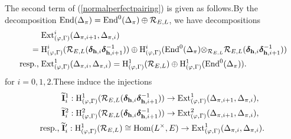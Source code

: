 \documentclass[SecEq,CM,GP]{degruyter-crelle} %
\theoremstyle{plain}
\newcommand{\EndO}{{\rm End}}
\newcommand{\ext}{{\rm Ext}}
\newcommand{\homo}{{\rm Hom}}
\newcommand{\hH}{{\mathrm{H}}}
\newcommand{\tee}{{{\otimes}_{\cR_{E,L}}}}
\newcommand{\bh}{{\mathbf{h}}}
\newcommand{\cR}{\mathcal R}
\begin{document}
The second term of (\ref{normalperfectpairing}) is given as follows.\;By the decomposition $\EndO(\Delta_{\pi})=\EndO^0(\Delta_{\pi})\oplus \cR_{E,L}$, we have decompositions
\begin{equation}\label{Linvariantdecomp}
\begin{aligned}
	&\ext^i_{(\varphi,\Gamma)}(\Delta_{\pi,i+1},\Delta_{\pi,i})\\
	=\;&\hH^i_{(\varphi,\Gamma)}(\cR_{E,L}(\bm{\delta}_{\bh,i}\bm{\delta}_{\bh,i+1}^{-1}))\oplus \hH^i_{(\varphi,\Gamma)}(\EndO^0(\Delta_{\pi})\tee\cR_{E,L}(\bm{\delta}_{\bh,i}\bm{\delta}_{\bh,i+1}^{-1}))\\
	\text{resp.,\;}& \ext^1_{(\varphi,\Gamma)}(\Delta_{\pi,i},\Delta_{\pi,i})=\hH^1_{(\varphi,\Gamma)}(\cR_{E,L})\oplus \hH^1_{(\varphi,\Gamma)}(\EndO^0(\Delta_{\pi})).
\end{aligned}
\end{equation}
for $i=0,1,2$.\;These induce the injections
\begin{equation}\label{i3p3q3}
\begin{aligned}
	&\widetilde{\mathbf{I}}_{i}^1:\hH^1_{(\varphi,\Gamma)}(\cR_{E,L}(\bm{\delta}_{\bh,i}\bm{\delta}_{\bh,i+1}^{-1}))\rightarrow \ext^1_{(\varphi,\Gamma)}(\Delta_{\pi,i+1},\Delta_{\pi,i}),\\
	&\widetilde{\mathbf{I}}_{i}^2:\hH^2_{(\varphi,\Gamma)}(\cR_{E,L}(\bm{\delta}_{\bh,i}\bm{\delta}_{\bh,i+1}^{-1}))\rightarrow \ext^2_{(\varphi,\Gamma)}(\Delta_{\pi,i+1},\Delta_{\pi,i}),\\
	\text{resp.,\;}& \widetilde{\mathbf{I}}'_{i}:\hH^1_{(\varphi,\Gamma)}(\cR_{E,L})\cong \homo(L^\times,E)\rightarrow \ext^1_{(\varphi,\Gamma)}(\Delta_{\pi,i},\Delta_{\pi,i}).\;
\end{aligned}
\end{equation}
\end{document}

